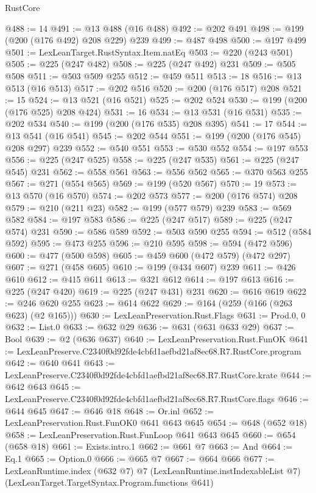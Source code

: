 \begin{lexlean}{RustCore}
\begin{coremodule}
@488 := 14
@491 := @13 @488 (@16 @488)
@492 := @202 @491
@498 := @199 (@200 (@176 @492) @208 @229) @239
@499 := @487 @498
@500 := @197 @499
@501 := LexLeanTarget.RustSyntax.Item.natEq
@503 := @220 (@243 @501)
@505 := @225 (@247 @482)
@508 := @225 (@247 @492) @231
@509 := @505 @508
@511 := @503 @509 @255
@512 := @459 @511
@513 := 18
@516 := @13 @513 (@16 @513)
@517 := @202 @516
@520 := @200 (@176 @517) @208
@521 := 15
@524 := @13 @521 (@16 @521)
@525 := @202 @524
@530 := @199 (@200 (@176 @525) @208 @424)
@531 := 16
@534 := @13 @531 (@16 @531)
@535 := @202 @534
@540 := @199 (@200 (@176 @535) @208 @395)
@541 := 17
@544 := @13 @541 (@16 @541)
@545 := @202 @544
@551 := @199 (@200 (@176 @545) @208 @297) @239
@552 := @540 @551
@553 := @530 @552
@554 := @197 @553
@556 := @225 (@247 @525)
@558 := @225 (@247 @535)
@561 := @225 (@247 @545) @231
@562 := @558 @561
@563 := @556 @562
@565 := @370 @563 @255
@567 := @271 (@554 @565)
@569 := @199 (@520 @567)
@570 := 19
@573 := @13 @570 (@16 @570)
@574 := @202 @573
@577 := @200 (@176 @574) @208
@579 := @210 (@211 @23)
@582 := @199 (@577 @579) @239
@583 := @569 @582
@584 := @197 @583
@586 := @225 (@247 @517)
@589 := @225 (@247 @574) @231
@590 := @586 @589
@592 := @503 @590 @255
@594 := @512 (@584 @592)
@595 := @473 @255
@596 := @210 @595
@598 := @594 (@472 @596)
@600 := @477 (@500 @598)
@605 := @459 @600 (@472 @579) (@472 @297)
@607 := @271 (@458 @605)
@610 := @199 (@434 @607) @239
@611 := @426 @610
@612 := @415 @611
@613 := @321 @612
@614 := @197 @613
@616 := @225 (@247 @420)
@619 := @225 (@247 @431) @231
@620 := @616 @619
@622 := @246 @620 @255
@623 := @614 @622
@629 := @164 (@259 (@166 (@263 @623) (@2 @165)))
@630 := LexLeanPreservation.Rust.Flags
@631 := Prod.{0, 0}
@632 := List.{0}
@633 := @632 @29
@636 := @631 (@631 @633 @29)
@637 := Bool
@639 := @2 (@636 @637)
@640 := LexLeanPreservation.Rust.FunOK
@641 := LexLeanPreserve.C2340f0d92fde4cbfd1aefbd21af8ec68.R7.RustCore.program
@642 := @640 @641
@643 := LexLeanPreserve.C2340f0d92fde4cbfd1aefbd21af8ec68.R7.RustCore.krate
@644 := @642 @643
@645 := LexLeanPreserve.C2340f0d92fde4cbfd1aefbd21af8ec68.R7.RustCore.flags
@646 := @644 @645
@647 := @646 @18
@648 := Or.inl
@652 := LexLeanPreservation.Rust.FunOK0 @641 @643 @645
@654 := @648 (@652 @18)
@658 := LexLeanPreservation.Rust.FunLoop @641 @643 @645
@660 := @654 (@658 @18)
@661 := Exists.intro.{1}
@662 := @661 @7
@663 := And
@664 := Eq.{1}
@665 := Option.{0}
@666 := @665 @7
@667 := @664 @666
@677 := LexLeanRuntime.index
    (@632 @7)
    @7
    (LexLeanRuntime.instIndexableList @7)
    (LexLeanTarget.TargetSyntax.Program.functions @641)

\end{coremodule}
\end{lexlean}

